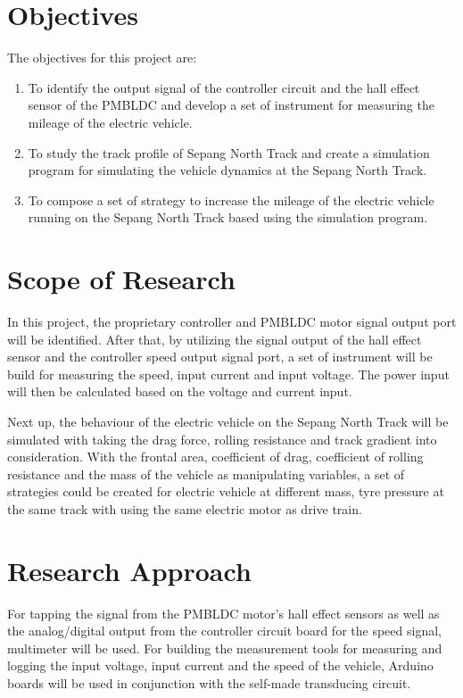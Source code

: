 \section{Objectives}

The objectives for this project are:

\begin{enumerate}
	\item To identify the output signal of the controller circuit and the hall effect sensor of the PMBLDC and develop a set of instrument for measuring the mileage of the electric vehicle.
	\item To study the track profile of Sepang North Track and create a simulation program for simulating the vehicle dynamics at the Sepang North Track.
	\item To compose a set of strategy to increase the mileage of the electric vehicle running on the Sepang North Track based using the simulation program.
\end{enumerate}

\section{Scope of Research}

In this project, the proprietary controller and PMBLDC motor signal output port will be identified. After that, by utilizing the signal output of the hall effect sensor and the controller speed output signal port, a set of instrument will be build for measuring the speed, input current and input voltage. The power input will then be calculated based on the voltage and current input.

Next up, the behaviour of the electric vehicle on the Sepang North Track will be simulated with taking the drag force, rolling resistance and track gradient into consideration. With the frontal area, coefficient of drag, coefficient of rolling resistance and the mass of the vehicle as manipulating variables, a set of strategies could be created for electric vehicle at different mass, tyre pressure at the same track with using the same electric motor as drive train.

\section{Research Approach}

For tapping the signal from the PMBLDC motor's hall effect sensors as well as the analog/digital output from the controller circuit board for the speed signal, multimeter will be used. For building the measurement tools for measuring and logging the input voltage, input current and the speed of the vehicle, Arduino boards will be used in conjunction with the self-made transducing circuit.

